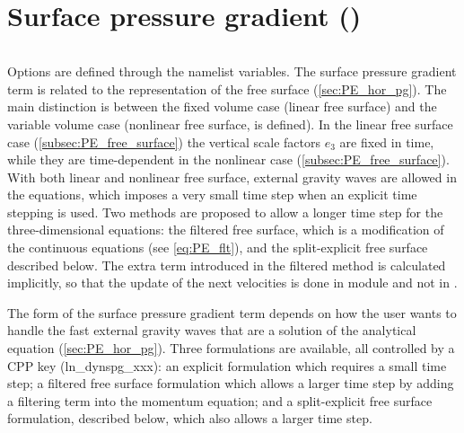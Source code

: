 \documentclass[../tex_main/NEMO_manual]{subfiles}
\begin{document}
\section{Surface pressure gradient (\protect{})}
\label{sec:DYN_spg}


$\ $\newline      %

Options are defined through the  namelist variables.
The surface pressure gradient term is related to the representation of the free surface (\autoref{sec:PE_hor_pg}).
The main distinction is between the fixed volume case (linear free surface) and
the variable volume case (nonlinear free surface,  is defined).
In the linear free surface case (\autoref{subsec:PE_free_surface})
the vertical scale factors $e_{3}$ are fixed in time,
while they are time-dependent in the nonlinear case (\autoref{subsec:PE_free_surface}).
With both linear and nonlinear free surface, external gravity waves are allowed in the equations, 
which imposes a very small time step when an explicit time stepping is used.
Two methods are proposed to allow a longer time step for the three-dimensional equations: 
the filtered free surface, which is a modification of the continuous equations (see \autoref{eq:PE_flt}), 
and the split-explicit free surface described below.
The extra term introduced in the filtered method is calculated implicitly, 
so that the update of the next velocities is done in module  and not in .


The form of the surface pressure gradient term depends on how the user wants to
handle the fast external gravity waves that are a solution of the analytical equation (\autoref{sec:PE_hor_pg}).
Three formulations are available, all controlled by a CPP key (ln\_dynspg\_xxx):
an explicit formulation which requires a small time step;
a filtered free surface formulation which allows a larger time step by
adding a filtering term into the momentum equation; 
and a split-explicit free surface formulation, described below, which also allows a larger time step.
\end{document}
